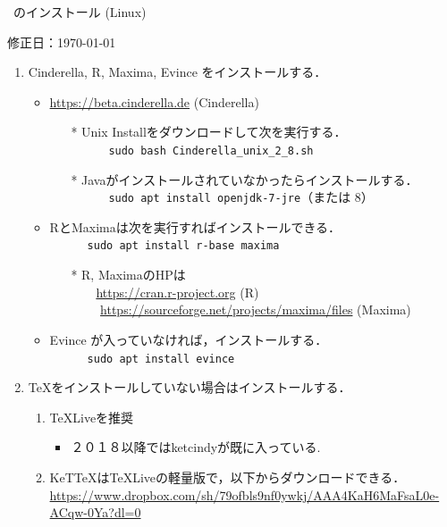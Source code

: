 \documentclass{ujarticle}
\begin{document}
\begin{center}
\ketcindy\ のインストール (Linux)
\end{center}

\hfill 修正日：\today

\begin{enumerate}[\bf\large 1.]
\item Cinderella, R, Maxima, Evince をインストールする．
 \begin{itemize}
 \item \url{https://beta.cinderella.de}  (Cinderella)
    \begin{itemize}
    \item[*]Unix Installをダウンロードして次を実行する．\\
　　　\verb|sudo bash Cinderella_unix_2_8.sh|
    \item[*]Javaがインストールされていなかったらインストールする．\\
　　　\verb|sudo apt install openjdk-7-jre|（または 8）
    \end{itemize}
    \item RとMaximaは次を実行すればインストールできる．\\
　　　\verb|sudo apt install r-base maxima|
    \begin{itemize}
    \item[*]R, MaximaのHPは\\
 　　\url{https://cran.r-project.org}   (R)\\
　　 \url{https://sourceforge.net/projects/maxima/files}  (Maxima)
    \end{itemize}
 \item Evince が入っていなければ，インストールする．\\
　　　\verb|sudo apt install evince|
 \end{itemize}

\item \TeX をインストールしていない場合はインストールする．
 \begin{enumerate}[(1)]
 \item TeXLiveを推奨
    \begin{itemize}
    \item ２０１８以降ではketcindyが既に入っている.
    \end{itemize}
\item KeTTeXはTeXLiveの軽量版で，以下からダウンロードできる．\\
    \hspace*{6mm}\url{https://www.dropbox.com/sh/79ofbls9nf0ywkj/AAA4KaH6MaFsaL0e-ACqw-0Ya?dl=0}


\end{enumerate}
\end{enumerate}
\end{document}
